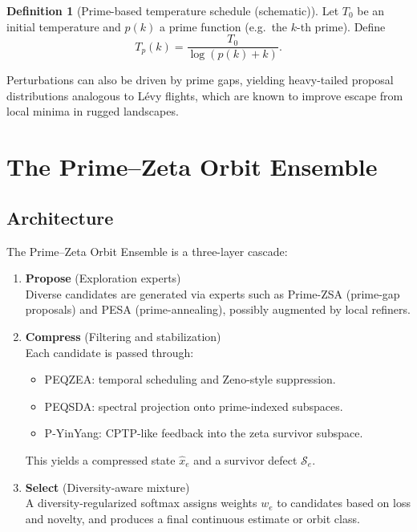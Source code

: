 \documentclass[11pt]{article}
\theoremstyle{definition}
\newtheorem{definition}{Definition}[section]
\theoremstyle{plain}
\theoremstyle{remark}
\begin{document}
\begin{definition}[Prime-based temperature schedule (schematic)]
Let $T_0$ be an initial temperature and $p(k)$ a prime function (e.g.\ the $k$-th prime). Define
\[
T_p(k) = \frac{T_0}{\log(p(k) + k)}.
\]
\end{definition}

Perturbations can also be driven by prime gaps, yielding heavy-tailed proposal distributions analogous to Lévy flights, which are known to improve escape from local minima in rugged landscapes.

\section{The Prime--Zeta Orbit Ensemble}

\subsection{Architecture}

The Prime--Zeta Orbit Ensemble is a three-layer cascade:

\begin{enumerate}[label=\textbf{Layer \Roman*:},leftmargin=*]
  \item \textbf{Propose} (Exploration experts)\\
    Diverse candidates are generated via experts such as Prime-ZSA (prime-gap proposals) and PESA (prime-annealing), possibly augmented by local refiners.

  \item \textbf{Compress} (Filtering and stabilization)\\
    Each candidate is passed through:
    \begin{itemize}
      \item PEQZEA: temporal scheduling and Zeno-style suppression.
      \item PEQSDA: spectral projection onto prime-indexed subspaces.
      \item P-YinYang: CPTP-like feedback into the zeta survivor subspace.
    \end{itemize}
    This yields a compressed state $\hat{x}_e$ and a survivor defect $\mathcal{S}_e$.

  \item \textbf{Select} (Diversity-aware mixture)\\
    A diversity-regularized softmax assigns weights $w_e$ to candidates based on loss and novelty, and produces a final continuous estimate or orbit class.
\end{enumerate}
\end{document}
